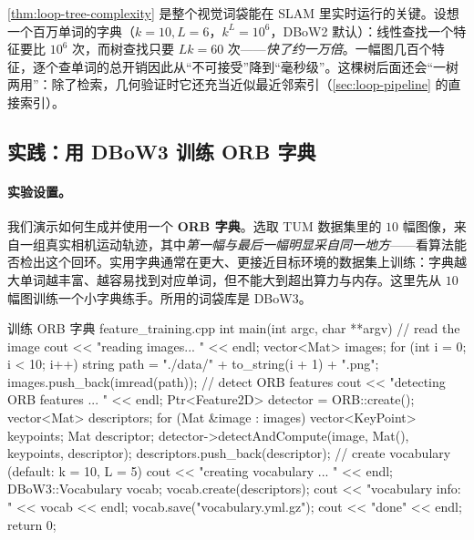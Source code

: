 \begin{insight}[对数查找是词袋能实时的根基]\label{ins:loop-logsearch}
\cref{thm:loop-tree-complexity} 是整个视觉词袋能在 SLAM 里实时运行的关键。设想一个百万单词的字典（$k=10,L=6$，$k^L=10^6$，DBoW2 默认\cite{galvez2012bags}）：线性查找一个特征要比 $10^6$ 次，而树查找只要 $Lk=60$ 次——\emph{快了约一万倍}。一幅图几百个特征，逐个查单词的总开销因此从“不可接受”降到“毫秒级”。这棵树后面还会“一树两用”：除了检索，几何验证时它还充当近似最近邻索引（\cref{sec:loop-pipeline} 的直接索引）。
\end{insight}

\subsection{实践：用 DBoW3 训练 ORB 字典}
\label{sec:loop-dict-practice}

\paragraph{实验设置。}
我们演示如何生成并使用一个 \textbf{ORB 字典}\cite{gaoxiang2019slam14}。选取 TUM 数据集里的 $10$ 幅图像，来自一组真实相机运动轨迹，其中\emph{第一幅与最后一幅明显采自同一地方}——看算法能否检出这个回环。实用字典通常在更大、更接近目标环境的数据集上训练：字典越大单词越丰富、越容易找到对应单词，但不能大到超出算力与内存。这里先从 $10$ 幅图训练一个小字典练手。所用的词袋库是 DBoW3。

\begin{codebox}[C++]{训练 ORB 字典 feature\_training.cpp}
int main(int argc, char **argv) {
    // read the image
    cout << "reading images... " << endl;
    vector<Mat> images;
    for (int i = 0; i < 10; i++) {
        string path = "./data/" + to_string(i + 1) + ".png";
        images.push_back(imread(path));
    }
    // detect ORB features
    cout << "detecting ORB features ... " << endl;
    Ptr<Feature2D> detector = ORB::create();
    vector<Mat> descriptors;
    for (Mat &image : images) {
        vector<KeyPoint> keypoints;
        Mat descriptor;
        detector->detectAndCompute(image, Mat(), keypoints, descriptor);
        descriptors.push_back(descriptor);
    }
    // create vocabulary (default: k = 10, L = 5)
    cout << "creating vocabulary ... " << endl;
    DBoW3::Vocabulary vocab;
    vocab.create(descriptors);
    cout << "vocabulary info: " << vocab << endl;
    vocab.save("vocabulary.yml.gz");
    cout << "done" << endl;
    return 0;
}
\end{codebox}

